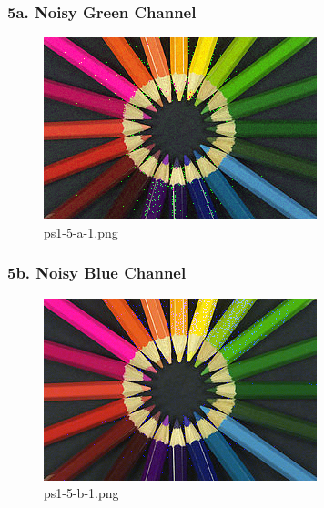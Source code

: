 	\begin{frame}
		\frametitle{5a. Noisy Green Channel}
		
		\begin{figure}[!htb]
			\centering
			\includegraphics[height=0.65\textheight]{./output/ps1-5-a-1.png}
			\caption{ps1-5-a-1.png} 
		\end{figure}	
		
	\end{frame}

	\begin{frame}
		\frametitle{5b. Noisy Blue Channel}
		
		\begin{figure}[!htb]
			\centering
			\includegraphics[height=0.65\textheight]{./output/ps1-5-b-1.png}
			\caption{ps1-5-b-1.png} 
		\end{figure}	
		
	\end{frame}

